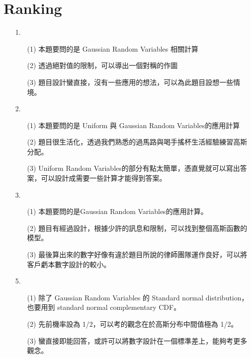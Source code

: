 \documentclass{article}
\begin{document}
\section*{Ranking}
\begin{enumerate}
    \item [1.]
    \begin{enumerate}
        \item [(1)]	本題要問的是 Gaussian Random Variables 相關計算
        \item [(2)]	透過絕對值的限制，可以導出一個對稱的作圖
        \item [(3)]	題目設計蠻直接，沒有一些應用的想法，可以為此題目設想一些情境。
    \end{enumerate}
    
    \item [2.]
    \begin{enumerate}
        \item [(1)] 本題要問的是 Uniform 與 Gaussian Random Variables的應用計算
        \item [(2)]	題目很生活化，透過我們熟悉的過馬路與喝手搖杯生活經驗練習高斯分配。
        \item [(3)]	Uniform Random Variables的部分有點太簡單，憑直覺就可以寫出答案，可以設計成需要一些計算才能得到答案。
    \end{enumerate}

    \item [3.]
    \begin{enumerate}
        \item [(1)] 本題要問的是Gaussian Random Variables的應用計算。
        \item [(2)] 題目有經過設計，根據少許的訊息和限制，可以找到整個高斯函數的模型。
        \item [(3)] 最後算出來的數字好像有違於題目所說的律師團隊運作良好，可以將客戶虧本數字設計的較小。
    \end{enumerate}

    \item [5.]
    \begin{enumerate}
        \item [(1)]	除了 Gaussian Random Variables 的 Standard normal distribution，也要用到 standard normal complementary CDF。
        \item [(2)]	先前機率設為 1/2，可以考的觀念在於高斯分布中間值極為 1/2。
        \item [(3)]	蠻直接即能回答，或許可以將數字設計在一個標準差上，能夠考更多觀念。
    \end{enumerate}


\end{enumerate}
\end{document}
